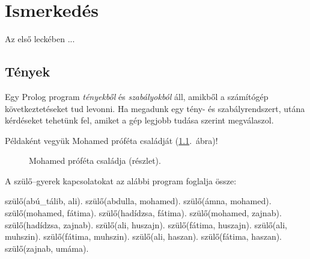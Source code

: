 
\chapter{Ismerkedés}

Az első leckében ...

\section{Tények}

Egy Prolog program \emph{tényekből} és
\emph{szabályokból} áll, amikből a számítógép
következtetéseket tud levonni. Ha megadunk egy
tény- és szabályrendszert, utána kérdéseket
tehetünk fel, amiket a gép legjobb tudása szerint
megválaszol.

Példaként vegyük Mohamed próféta családját
(\ref{fig:csaladfa}.~ábra)!
%
\begin{figure}
  \centering
  \caption{Mohamed próféta családja (részlet).}
  \label{fig:csaladfa}
\end{figure}
%
A szülő--gyerek kapcsolatokat az alábbi program
foglalja össze:

\begin{program}
szülő(abú_tálib, ali).
szülő(abdulla, mohamed).
szülő(ámna, mohamed).
szülő(mohamed, fátima).
szülő(hadídzsa, fátima).
szülő(mohamed, zajnab).
szülő(hadídzsa, zajnab).
szülő(ali, huszajn).
szülő(fátima, huszajn).
szülő(ali, muhszin).
szülő(fátima, muhszin).
szülő(ali, haszan).
szülő(fátima, haszan).
szülő(zajnab, umáma).
\end{program}

